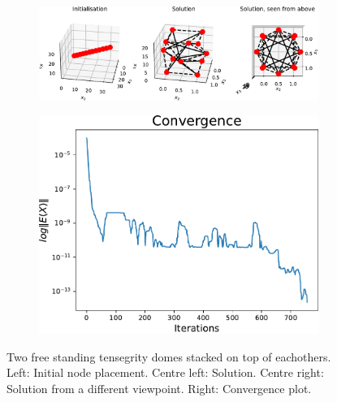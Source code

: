 \begin{figure}[!ht]
\centering
\begin{subfigure}{.72\textwidth}
  \centering
  \includegraphics[width=0.99\linewidth]{Bilder/2freestanding.pdf}
\end{subfigure}%
\begin{subfigure}{.3\textwidth}
  \centering
  \includegraphics[width=0.99\linewidth]{Bilder/2freestandingconv.pdf}
\end{subfigure}
\caption{Two free standing tensegrity domes stacked on top of eachothers. Left: Initial node placement. Centre left: Solution. Centre right: Solution from a different viewpoint. Right: Convergence plot.}
\label{2free}
\end{figure}

